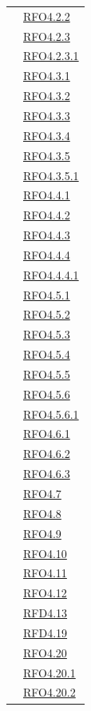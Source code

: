 \begin{itemize}
\begin{itemize}
\begin{itemize}
\begin{itemize}
\begin{longtable}{|>{\centering}m{5cm}|m{5cm}<{\centering}|}
& \hyperlink{RFO4.2.2}{RFO4.2.2}\\
& \hyperlink{RFO4.2.3}{RFO4.2.3}\\
& \hyperlink{RFO4.2.3.1}{RFO4.2.3.1}\\
& \hyperlink{RFO4.3.1}{RFO4.3.1}\\
& \hyperlink{RFO4.3.2}{RFO4.3.2}\\
& \hyperlink{RFO4.3.3}{RFO4.3.3}\\
& \hyperlink{RFO4.3.4}{RFO4.3.4}\\
& \hyperlink{RFO4.3.5}{RFO4.3.5}\\
& \hyperlink{RFO4.3.5.1}{RFO4.3.5.1}\\
& \hyperlink{RFO4.4.1}{RFO4.4.1}\\
& \hyperlink{RFO4.4.2}{RFO4.4.2}\\
& \hyperlink{RFO4.4.3}{RFO4.4.3}\\
& \hyperlink{RFO4.4.4}{RFO4.4.4}\\
& \hyperlink{RFO4.4.4.1}{RFO4.4.4.1}\\
& \hyperlink{RFO4.5.1}{RFO4.5.1}\\
& \hyperlink{RFO4.5.2}{RFO4.5.2}\\
& \hyperlink{RFO4.5.3}{RFO4.5.3}\\
& \hyperlink{RFO4.5.4}{RFO4.5.4}\\
& \hyperlink{RFO4.5.5}{RFO4.5.5}\\
& \hyperlink{RFO4.5.6}{RFO4.5.6}\\
& \hyperlink{RFO4.5.6.1}{RFO4.5.6.1}\\
& \hyperlink{RFO4.6.1}{RFO4.6.1}\\
& \hyperlink{RFO4.6.2}{RFO4.6.2}\\
& \hyperlink{RFO4.6.3}{RFO4.6.3}\\
& \hyperlink{RFO4.7}{RFO4.7}\\
& \hyperlink{RFO4.8}{RFO4.8}\\
& \hyperlink{RFO4.9}{RFO4.9}\\
& \hyperlink{RFO4.10}{RFO4.10}\\
& \hyperlink{RFO4.11}{RFO4.11}\\
& \hyperlink{RFO4.12}{RFO4.12}\\
& \hyperlink{RFD4.13}{RFD4.13}\\
& \hyperlink{RFD4.19}{RFD4.19}\\
& \hyperlink{RFO4.20}{RFO4.20}\\
& \hyperlink{RFO4.20.1}{RFO4.20.1}\\
& \hyperlink{RFO4.20.2}{RFO4.20.2}\\

\end{longtable}
\end{itemize}
\end{itemize}
\end{itemize}
\end{itemize}
